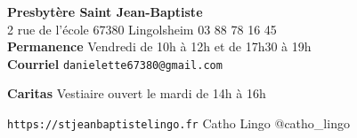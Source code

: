 \begin{framed}
\textbf{Presbytère Saint Jean-Baptiste} \\
2 rue de l'école 67380 Lingolsheim 03 88 78 16 45 \\
\textbf{Permanence} Vendredi de 10h à 12h et de 17h30 à 19h\\
\textbf{Courriel} \texttt{danielette67380@gmail.com}

\textbf{Caritas} Vestiaire ouvert le mardi de 14h à 16h

\texttt{https://stjeanbaptistelingo.fr} \hfill \faFacebook Catho Lingo \hfill \faInstagram @catho\_lingo
\end{framed}

